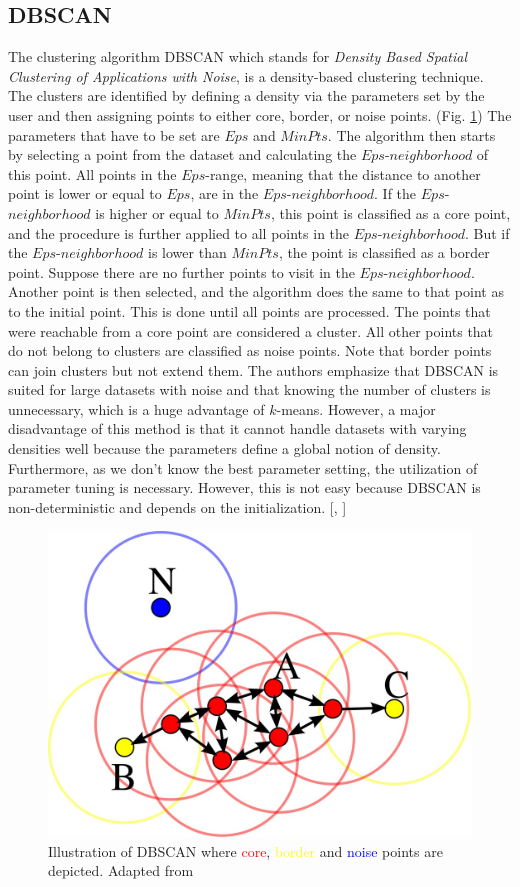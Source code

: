 \subsection{DBSCAN}

The clustering algorithm DBSCAN which stands for \textit{Density Based Spatial Clustering of Applications with Noise}, is a density-based clustering technique. The clusters are identified by defining a density via the parameters set by the user and then assigning points to either core, border, or noise points. (Fig. \ref{fig:dbscan}) The parameters that have to be set are $Eps$ and $MinPts$. The algorithm then starts by selecting a point from the dataset and calculating the $Eps$-$neighborhood$ of this point. All points in the $Eps$-range, meaning that the distance to another point is lower or equal to $Eps$, are in the $Eps$-$neighborhood$. If the $Eps$-$neighborhood$ is higher or equal to $MinPts$, this point is classified as a core point, and the procedure is further applied to all points in the $Eps$-$neighborhood$. But if the $Eps$-$neighborhood$ is lower than $MinPts$, the point is classified as a border point. Suppose there are no further points to visit in the $Eps$-$neighborhood$. Another point is then selected, and the algorithm does the same to that point as to the initial point. This is done until all points are processed. The points that were reachable from a core point are considered a cluster. All other points that do not belong to clusters are classified as noise points. Note that border points can join clusters but not extend them. The authors emphasize that DBSCAN is suited for large datasets with noise and that knowing the number of clusters is unnecessary, which is a huge advantage of $k$-means. However, a major disadvantage of this method is that it cannot handle datasets with varying densities well because the parameters define a global notion of density. Furthermore, as we don't know the best parameter setting, the utilization of parameter tuning is necessary. However, this is not easy because DBSCAN is non-deterministic and depends on the initialization. [\cite{clustering(1)}, \cite{dbscan}]
\begin{figure}[!]
	\centering
	\includegraphics[width=0.75\columnwidth]{images/dbscan.jpg}
	\caption[Illustration of DBSCAN]{Illustration of DBSCAN where \textcolor{red}{core}, \textcolor{yellow}{border} and \textcolor{blue}{noise} points are depicted. Adapted from \footnotemark}
    \label{fig:dbscan}
\end{figure}
